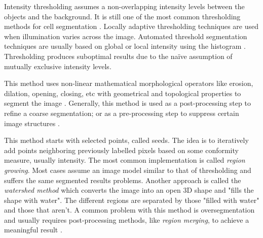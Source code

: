 \begin{definition}
	Intensity thresholding assumes a non-overlapping intensity levels between the objects and the background.
	It is still one of the most common thresholding methods for cell segmentation \citep{WuMerchantCastleman2008,Meijering2004,Quanli2011}.
	Locally adaptive thresholding techniques are used when illumination varies across the image.
	Automated threshold segmentation techniques are usually based on global or local intensity using the histogram \citep{Bengtsson2004}.
	Thresholding produces suboptimal results due to the na{\"i}ve assumption of mutually exclusive intensity levels.
\end{definition}

\begin{definition}
	This method uses non-linear mathematical morphological operators like erosion, dilation, opening, closing, etc with geometrical and topological properties to segment the image \citep{GonzalezWoods2002,Meijering2004,Dorini2007,Anoraganingrum1999,Kumar2002}.
	Generally, this method is used as a post-processing step to refine a coarse segmentation; or as a pre-processing step to suppress certain image structures \citep{Bengtsson2004}.
\end{definition}

\begin{definition}
	This method starts with selected points, called seeds.
	The idea is to iteratively add points neighboring previously labelled pixels based on some conformity measure, usually intensity.
	The most common implementation is called \textit{region growing}.
	Most cases assume an image model similar to that of thresholding and suffers the same segmented results problems.
	Another approach is called the \textit{watershed method} which converts the image into an open 3D shape and "fills the shape with water".
	The different regions are separated by those "filled with water" and those that aren't.
	A common problem with this method is oversegmentation and usually requires post-processing methods, like \textit{region merging}, to achieve a meaningful result \citep{Jiang2003,Lin2003,Bengtsson2004}.
\end{definition}

